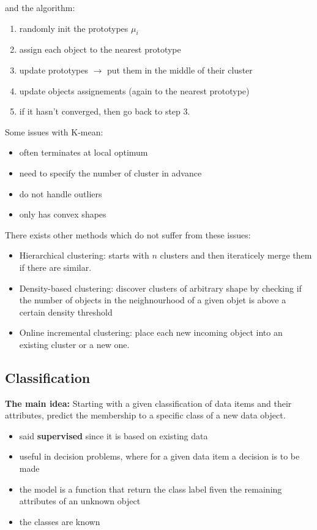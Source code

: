 and the algorithm:

\noindent

\begin{enumerate}
	\item randomly init the prototypes $\mu_i$
	\item assign each object to the nearest prototype
	\item update prototypes $\rightarrow$ put them in the middle of their cluster
	\item update objects assignements (again to the nearest prototype)
	\item if it hasn't converged, then go back to step 3.
\end{enumerate}
Some issues with K-mean:
\begin{itemize}
	\item often terminates at local optimum
	\item need to specify the number of cluster in advance
	\item do not handle outliers
	\item only has convex shapes
\end{itemize}
There exists other methods which do not suffer from these issues:
\begin{itemize}
	\item Hierarchical clustering: starts with $n$ clusters and then iteraticely merge them if there are similar.

	\item Density-based clustering: discover clusters of arbitrary shape by checking if the number of objects in the neighnourhood of a given objet is above a certain density threshold

	\item Online incremental clustering: place each new incoming object into an existing cluster or a new one.
\end{itemize}


\subsection{Classification}
\textbf{The main idea:} Starting with a given classification of data items and their attributes, predict the membership to a specific class of a new data object.

\begin{itemize}
	\item said \textbf{supervised} since it is based on existing data
	\item useful in decision problems, where for a given data item a decision is to be made
	\item the model is a function that return the class label fiven the remaining attributes of an unknown object
	\item the classes are known
\end{itemize}

